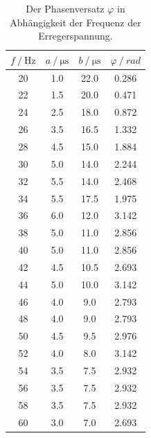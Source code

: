 \begin{table}[H]
  \centering
  \caption{Der Phasenversatz $\varphi$ in Abhängigkeit der Frequenz der Erregerspannung.}
  \begin{tabular}{cccc}
    \toprule
    {$f \mathbin{/} \unit{\hertz}$} &
    {$a \mathbin{/} \unit{\micro\second}$} &
    {$b \mathbin{/} \unit{\micro\second}$} &
    {$\varphi \mathbin{/} rad$} \\
    \midrule
    
    20 & 1.0 & 22.0 & 0.286 \\
    22 & 1.5 & 20.0 & 0.471 \\
    24 & 2.5 & 18.0 & 0.872 \\
    26 & 3.5 & 16.5 & 1.332 \\
    28 & 4.5 & 15.0 & 1.884 \\
    30 & 5.0 & 14.0 & 2.244 \\
    32 & 5.5 & 14.0 & 2.468 \\
    34 & 5.5 & 17.5 & 1.975 \\
    36 & 6.0 & 12.0 & 3.142 \\
    38 & 5.0 & 11.0 & 2.856 \\
    40 & 5.0 & 11.0 & 2.856 \\
    42 & 4.5 & 10.5 & 2.693 \\
    44 & 5.0 & 10.0 & 3.142 \\
    46 & 4.0 & 9.0  &  2.793 \\
    48 & 4.0 & 9.0  &  2.793 \\
    50 & 4.5 & 9.5  &  2.976 \\
    52 & 4.0 & 8.0  &  3.142 \\
    54 & 3.5 & 7.5  &  2.932 \\
    56 & 3.5 & 7.5  &  2.932 \\
    58 & 3.5 & 7.5  &  2.932 \\
    60 & 3.0 & 7.0  &  2.693 \\
    
    \bottomrule
  \end{tabular}
  \label{tab:Tabelle2}
\end{table}



